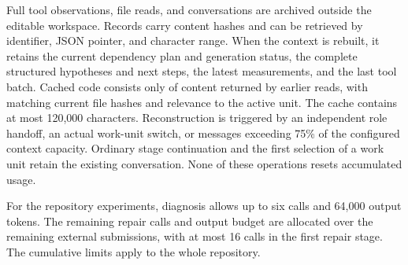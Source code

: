 \documentclass{article}
\begin{document}
Full tool observations, file reads, and conversations are archived outside the editable workspace. Records carry content hashes and can be retrieved by identifier, JSON pointer, and character range. When the context is rebuilt, it retains the current dependency plan and generation status, the complete structured hypotheses and next steps, the latest measurements, and the last tool batch. Cached code consists only of content returned by earlier reads, with matching current file hashes and relevance to the active unit. The cache contains at most 120,000 characters. Reconstruction is triggered by an independent role handoff, an actual work-unit switch, or messages exceeding 75\% of the configured context capacity. Ordinary stage continuation and the first selection of a work unit retain the existing conversation. None of these operations resets accumulated usage.

For the repository experiments, diagnosis allows up to six calls and 64,000 output tokens. The remaining repair calls and output budget are allocated over the remaining external submissions, with at most 16 calls in the first repair stage. The cumulative limits apply to the whole repository.
\end{document}
